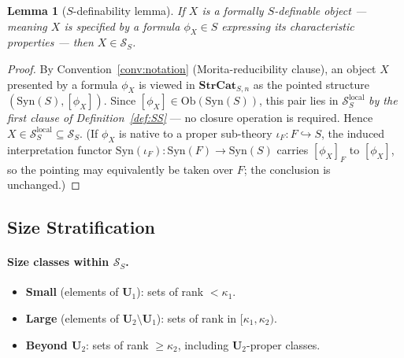 \documentclass[11pt]{article}
\theoremstyle{plain}
\newtheorem{lemma}[theorem]{Lemma}
\theoremstyle{definition}
\newcommand{\cS}{\mathcal{S}}
\newcommand{\Ob}{\mathrm{Ob}}
\newcommand{\Syn}{\mathrm{Syn}}
\begin{document}
\begin{lemma}[$S$-definability lemma]\label{lem:SS-membership}
If $X$ is a formally $S$-definable object --- meaning $X$ is specified by a formula $\phi_X \in S$ expressing its characteristic properties --- then $X \in \cS_S$.
\end{lemma}

\begin{proof}
By Convention~\ref{conv:notation} (Morita-reducibility clause), an object $X$ presented by a formula $\phi_X$ is viewed in $\mathbf{StrCat}_{S, n}$ as the pointed structure $(\Syn(S), [\phi_X])$. Since $[\phi_X] \in \Ob(\Syn(S))$, this pair lies in $\cS_S^{\mathrm{local}}$ \emph{by the first clause of Definition~\ref{def:SS}} --- no closure operation is required. Hence $X \in \cS_S^{\mathrm{local}} \subseteq \cS_S$. (If $\phi_X$ is native to a proper sub-theory $\iota_F : F \hookrightarrow S$, the induced interpretation functor $\Syn(\iota_F) : \Syn(F) \to \Syn(S)$ carries $[\phi_X]_F$ to $[\phi_X]$, so the pointing may equivalently be taken over $F$; the conclusion is unchanged.)
\end{proof}

\subsection{Size Stratification}\label{sec:size-stratification}

\paragraph{Size classes within $\cS_S$.}
\begin{itemize}
\item \textbf{Small} (elements of $\mathbf{U}_1$): sets of rank $< \kappa_1$.
\item \textbf{Large} (elements of $\mathbf{U}_2 \setminus \mathbf{U}_1$): sets of rank in $[\kappa_1, \kappa_2)$.
\item \textbf{Beyond $\mathbf{U}_2$}: sets of rank $\geq \kappa_2$, including $\mathbf{U}_2$-proper classes.
\end{itemize}
\end{document}
